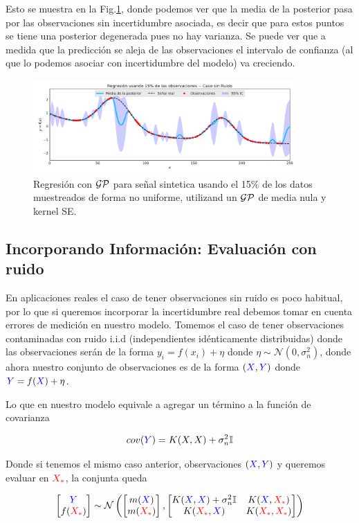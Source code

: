 Esto se muestra en la Fig.\ref{fig:gp_2}, donde podemos ver que la media de la posterior pasa por las observaciones sin incertidumbre asociada, es decir que para estos puntos se tiene una posterior degenerada pues no hay varianza. Se puede ver que a medida que la predicción se aleja de las observaciones el intervalo de confianza (al que lo podemos asociar con incertidumbre del modelo) va creciendo.

\begin{figure}[H]
	\centering
	\includegraphics[width=0.9\textwidth]{img/gp_posterior_noiseless.pdf}
	\caption{Regresión con $\mathcal{GP}$ para señal sintetica usando el 15$\%$ de los datos muestreados de forma no uniforme, utilizand un $\mathcal{GP}$ de media nula y kernel SE.} 
	\label{fig:gp_2}
\end{figure}

\subsection{Incorporando Información: Evaluación con ruido}

En aplicaciones reales el caso de tener observaciones sin ruido es poco habitual, por lo que si queremos incorporar la incertidumbre real debemos tomar en cuenta errores de medición en nuestro modelo. Tomemos el caso de tener observaciones contaminadas con ruido i.i.d (independientes idénticamente distribuidas) donde las observaciones serán de la forma $y_i = f(x_i) + \eta$ donde $\eta \sim \mathcal{N}(0, \sigma_n^2)$, donde ahora nuestro conjunto de observaciones es de la forma $(\textcolor{blue}{X}, \textcolor{blue}{Y})$ donde $\textcolor{blue}{Y}=f(\textcolor{blue}{X}) + \eta$.

Lo que en nuestro modelo equivale a agregar un término a la función de covarianza

\begin{equation}
	cov(\textcolor{blue}{Y}) = K(X, X) + \sigma_n^2{\mathbb I}
\end{equation}

Donde si tenemos el mismo caso anterior, observaciones $(\textcolor{blue}{X}, \textcolor{blue}{Y})$ y queremos evaluar en $\textcolor{red}{X_*}$, la conjunta queda


\begin{align}
	\begin{bmatrix} \textcolor{blue}{Y} \\ f(\textcolor{red}{X_*})  \end{bmatrix}
	\sim \mathcal{N} \left(
	\begin{bmatrix} m(\textcolor{blue}{X}) \\ m(\textcolor{red}{X_*})  \end{bmatrix}, 
	\begin{bmatrix}
		K(\textcolor{blue}{X}, \textcolor{blue}{X}) + \sigma_n^2 {\mathbb I} & K(\textcolor{blue}{X}, \textcolor{red}{X_*}) \\ K(\textcolor{red}{X_*}, \textcolor{blue}{X}) & K(\textcolor{red}{X_*}, \textcolor{red}{X_*})
	\end{bmatrix}
	 \right)
\end{align}

